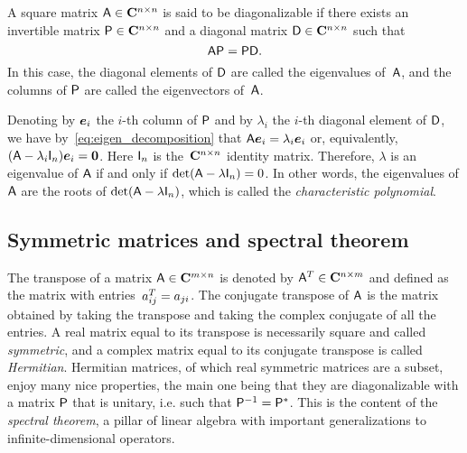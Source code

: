 \begin{definition}
    \label{definition:diagonalizable}
    A square matrix $\mathsf A \in \mathbf C^{n \times n}$ is said to be diagonalizable if there exists an invertible matrix $\mathsf P \in \mathbf C^{n \times n}$
    and a diagonal matrix $\mathsf D \in \mathbf C^{n \times n}$ such that
    \begin{equation}
        \label{eq:eigen_decomposition}
        \mathsf A \mathsf P = \mathsf P \mathsf D.
    \end{equation}
    In this case,
    the diagonal elements of $\mathsf D$ are called the eigenvalues of~$\mathsf A$,
    and the columns of $\mathsf P$ are called the eigenvectors of~$\mathsf A$.
\end{definition}
Denoting by $\mathbf{\boldsymbol{e}}_i$ the $i$-th column of $\mathsf P$ and by $\lambda_i$ the $i$-th diagonal element of $\mathsf D$,
we have by~\eqref{eq:eigen_decomposition} that $\mathsf A \mathbf{\boldsymbol{e}}_i = \lambda_i \mathbf{\boldsymbol{e}}_i$ or,
equivalently, $(\mathsf A - \lambda_i \mathsf I_n) \mathbf{\boldsymbol{e}}_i = \mathbf{\boldsymbol{0}}$.
Here $\mathsf I_n$ is the~$\mathbf C^{n \times n}$ identity matrix.
Therefore, $\lambda$ is an eigenvalue of $\mathsf A$ if and only if $\det(\mathsf A - \lambda \mathsf I_n) = 0$.
In other words, the eigenvalues of $\mathsf A$ are the roots of $\det(\mathsf A - \lambda \mathsf I_n)$,
which is called the \emph{characteristic polynomial}.

\subsection*{Symmetric matrices and spectral theorem}%
The transpose of a matrix $\mathsf A \in \mathbf C^{m \times n}$ is denoted by $\mathsf A^T \in \mathbf C^{n \times m}$
and defined as the matrix with entries~$a^T_{ij} = a_{ji}$.
The conjugate transpose of $\mathsf A$ is the matrix obtained by taking the transpose and taking the complex conjugate of all the entries.
A real matrix equal to its transpose is necessarily square and called \emph{symmetric},
and a complex matrix equal to its conjugate transpose is called \emph{Hermitian}.
Hermitian matrices, of which real symmetric matrices are a subset,
enjoy many nice properties,
the main one being that they are diagonalizable with a matrix $\mathsf P$ that is unitary,
i.e. such that $\mathsf P^{-1} = \mathsf P^*$.
This is the content of the \emph{spectral theorem},
a pillar of linear algebra with important generalizations to infinite-dimensional operators.

